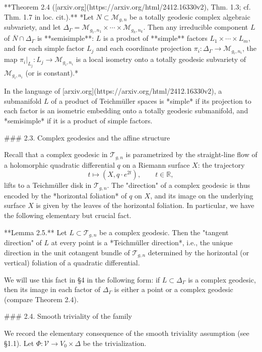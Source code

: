 **Theorem 2.4 ([arxiv.org](https://arxiv.org/html/2412.16330v2), Thm. 1.3; cf. Thm. 1.7 in loc. cit.).** *Let $N \subset \mathcal{M}_{g,n}$ be a totally geodesic complex algebraic subvariety, and let $\Delta_\Gamma = \mathcal{M}_{g_1,n_1} \times \cdots \times \mathcal{M}_{g_k,n_k}$. Then any irreducible component $L$ of $\overline{N} \cap \Delta_\Gamma$ is **semisimple**: $L$ is a product of **simple** factors $L_1 \times \cdots \times L_m$, and for each simple factor $L_j$ and each coordinate projection $\pi_i : \Delta_\Gamma \to \mathcal{M}_{g_i,n_i}$, the map $\pi_i|_{L_j} : L_j \to \mathcal{M}_{g_i,n_i}$ is a local isometry onto a totally geodesic subvariety of $\mathcal{M}_{g_i,n_i}$ (or is constant).*

In the language of [arxiv.org](https://arxiv.org/html/2412.16330v2), a submanifold $L$ of a product of Teichmüller spaces is *simple* if its projection to each factor is an isometric embedding onto a totally geodesic submanifold, and *semisimple* if it is a product of simple factors.

### 2.3. Complex geodesics and the affine structure

Recall that a complex geodesic in $\mathcal{T}_{g,n}$ is parametrized by the straight-line flow of a holomorphic quadratic differential $q$ on a Riemann surface $X$: the trajectory
$$t \mapsto (X, q \cdot e^{2t}), \qquad t \in \mathbb{R},$$
lifts to a Teichmüller disk in $\mathcal{T}_{g,n}$. The "direction" of a complex geodesic is thus encoded by the *horizontal foliation* of $q$ on $X$, and its image on the underlying surface $X$ is given by the leaves of the horizontal foliation. In particular, we have the following elementary but crucial fact.

**Lemma 2.5.** Let $L \subset \mathcal{T}_{g,n}$ be a complex geodesic. Then the "tangent direction" of $L$ at every point is a *Teichmüller direction*, i.e., the unique direction in the unit cotangent bundle of $\mathcal{T}_{g,n}$ determined by the horizontal (or vertical) foliation of a quadratic differential.

We will use this fact in §4 in the following form: if $L \subset \Delta_\Gamma$ is a complex geodesic, then its image in each factor of $\Delta_\Gamma$ is either a point or a complex geodesic (compare Theorem 2.4).

### 2.4. Smooth triviality of the family

We record the elementary consequence of the smooth triviality assumption (see §1.1). Let $\Phi : \mathcal{V} \to V_0 \times \Delta$ be the trivialization.

